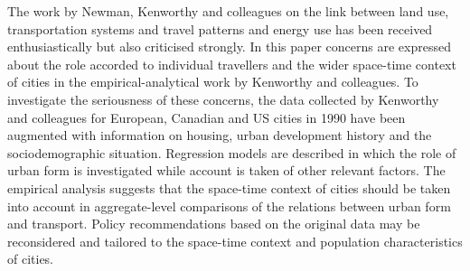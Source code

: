 The work by Newman, Kenworthy and colleagues on the link between land use, transportation systems and travel patterns and energy use has been received enthusiastically but also criticised strongly. In this paper concerns are expressed about the role accorded to individual travellers and the wider space-time context of cities in the empirical-analytical work by Kenworthy and colleagues. To investigate the seriousness of these concerns, the data collected by Kenworthy and colleagues for European, Canadian and US cities in 1990 have been augmented with information on housing, urban development history and the sociodemographic situation. Regression models are described in which the role of urban form is investigated while account is taken of other relevant factors. The empirical analysis suggests that the space-time context of cities should be taken into account in aggregate-level comparisons of the relations between urban form and transport. Policy recommendations based on the original data may be reconsidered and tailored to the space-time context and population characteristics of cities.